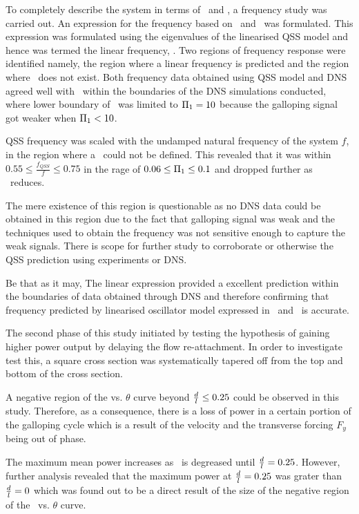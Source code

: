 To completely describe the system in terms of \massstiff\ and \massdamp, a frequency study was carried out. An expression for the frequency based on \massstiff\ and \massdamp\ was formulated. This expression was formulated using the eigenvalues of the linearised QSS model and hence was termed the linear frequency,  \freqlin. Two regions of frequency response were identified namely, the region where a linear frequency is predicted and the region where \freqlin\ does not exist. Both frequency data obtained using QSS model and DNS agreed well with \freqlin\ within the boundaries of the DNS simulations conducted, where lower boundary of \massstiff\ was limited to $\Pi_1=10$ because the galloping signal got weaker when $\Pi_1<10$. 

QSS frequency was scaled with the undamped natural frequency of the system $f$, in the region where a \freqlin\ could not be defined. This revealed that it was within $0.55\leq\frac{f_{QSS}}{f}\leq0.75$ in the rage of $0.06\leq\Pi_1\leq0.1$ and dropped further as \massstiff\ reduces.  

The mere existence of this region is questionable as no DNS data could be obtained in this region due to the fact that galloping signal was weak and the techniques used to obtain the  frequency was not sensitive enough to capture the weak signals. There is scope for further study to corroborate or otherwise the QSS prediction using experiments or DNS. 

Be that as it may, The linear expression provided a excellent prediction within the boundaries of data obtained through DNS and therefore confirming that frequency predicted by linearised oscillator model expressed in \massstiff\ and \massdamp\ is accurate.  


The second phase of this study initiated by testing the hypothesis of gaining higher power output by delaying the flow re-attachment. In order to investigate test this, a square cross section was systematically tapered off from the top and bottom of the cross section.

A negative region of the \cy vs. $\theta$ curve beyond $\frac{d}{l}\leq0.25$ could be observed in this study. Therefore, as a consequence, there is a loss of power in a certain portion of the galloping cycle which is a result of the velocity and the transverse forcing $F_{y}$ being out of phase. 

The maximum mean power increases as \ratio\ is degreased until $\frac{d}{l}=0.25$. However, further analysis revealed that the maximum power at $\frac{d}{l}=0.25$ was grater than $\frac{d}{l}=0$ which was found out to be a direct result of the size of the negative region of the \cy\ vs. $\theta$ curve.

